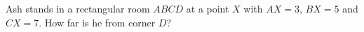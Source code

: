 Ash stands in a rectangular room $ABCD$ at a point $X$ with $AX=3$, $BX=5$ and $CX=7$. How far is he from corner $D$?
